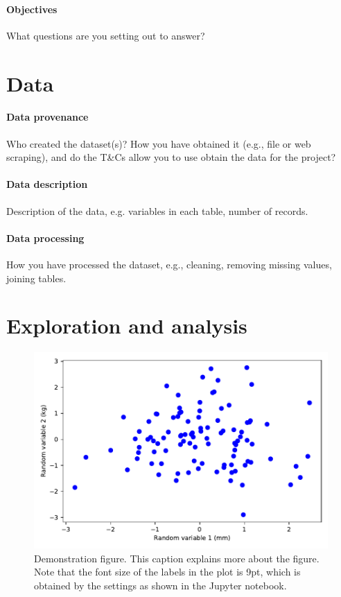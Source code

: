 \documentclass[11pt,a4paper]{article}
\begin{document}
\paragraph{Objectives}

What questions are you setting out to answer?

\section{Data}

\paragraph{Data provenance} Who created the dataset(s)?  How you have
obtained it (e.g., file or web scraping), and do the T\&Cs allow you
to use obtain the data for the project?

\paragraph{Data description} Description of the data, e.g. variables
in each table, number of records.

\paragraph{Data processing} How you have processed the dataset, e.g.,
cleaning, removing missing values, joining tables.

\section{Exploration and  analysis}

\begin{figure}[t]
  \centering
  \includegraphics{example1}
  \caption{Demonstration figure. This caption explains more about the
    figure. Note that the font size of the labels in the plot is 9pt,
    which is obtained by the settings as shown in the Jupyter
    notebook.}
  \label{fds-project-template:fig:example1}
\end{figure}
\end{document}
